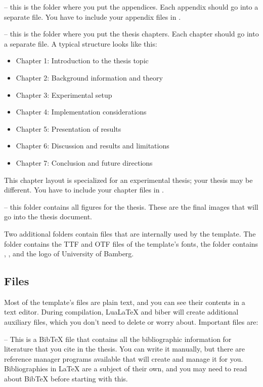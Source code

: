  -- this is the folder where you put the appendices. Each appendix should go into a separate  file. You have to include your appendix files in .

 -- this is the folder where you put the thesis chapters. Each chapter should go into a separate  file. A typical structure looks like this:
\begin{itemize}
\item Chapter 1: Introduction to the thesis topic
\item Chapter 2: Background information and theory
\item Chapter 3: Experimental setup
\item Chapter 4: Implementation considerations
\item Chapter 5: Presentation of results
\item Chapter 6: Discussion and results and limitations
\item Chapter 7: Conclusion and future directions
\end{itemize}

This chapter layout is specialized for an experimental thesis; your thesis may be different. You have to include your chapter files in .

 -- this folder contains all figures for the thesis. These are the final images that will go into the thesis document.

Two additional folders contain files that are internally used by the template. The folder  contains the TTF and OTF files of the template's fonts, the folder  contains , , and the logo of University of Bamberg.

\subsection{Files}

Most of the template's files are plain text, and you can see their contents in a text editor. During compilation, LuaLaTeX and biber will create additional auxiliary files, which you don't need to delete or worry about. Important files are:

 -- This is a BibTeX file that contains all the bibliographic information for literature that you cite in the thesis. You can write it manually, but there are reference manager programs available that will create and manage it for you. Bibliographies in LaTeX are a subject of their own, and you may need to read about BibTeX before starting with this.

